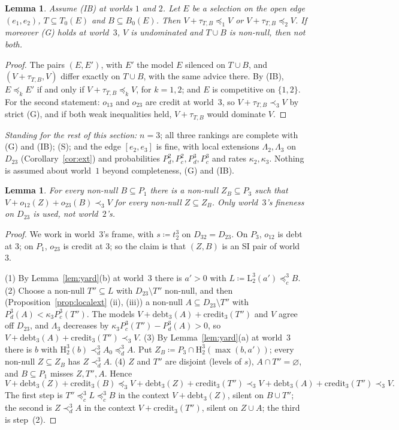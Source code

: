 \documentclass[11pt]{article}
\newtheorem{lemma}[theorem]{Lemma}
\theoremstyle{definition}\newtheorem{definition}[theorem]{Definition}
\theoremstyle{remark}\newtheorem{remark}[theorem]{Remark}
\newcommand{\debt}{\mathrm{debt}}
\newcommand{\cred}{\mathrm{credit}}
\newcommand{\Lo}[3]{\mathrm L^{#1}_{#2}(#3)}
\newcommand{\Hi}[3]{\mathrm H^{#1}_{#2}(#3)}
\begin{document}
\begin{lemma}\label{lem:XOR}
Assume (IB) at worlds $1$ and $2$. Let $E$ be a selection on the open edge
$(e_1,e_2)$, $T\subseteq T_0(E)$ and $B\subseteq B_0(E)$. Then
$V+\tau_{T,B}\preceq_1V$ or $V+\tau_{T,B}\preceq_2V$. If moreover (G) holds
at world~$3$, $V$ is undominated and $T\cup B$ is non-null, then not both.
\end{lemma}
\begin{proof}
The pairs $(E,E')$, with $E'$ the model $E$ silenced on $T\cup B$, and
$(V+\tau_{T,B},V)$ differ exactly on $T\cup B$, with the same advice there.
By (IB), $E\preceq_kE'$ if and only if $V+\tau_{T,B}\preceq_kV$, for
$k=1,2$; and $E$ is competitive on $\{1,2\}$. For the second statement:
$o_{13}$ and $o_{23}$ are credit at world~$3$, so $V+\tau_{T,B}\prec_3V$ by
strict (G), and if both weak inequalities held, $V+\tau_{T,B}$ would dominate
$V$.
\end{proof}

\emph{Standing for the rest of this section:} $n=3$; all three rankings are
complete with (G) and (IB); (S); and the edge $[e_2,e_3]$ is fine, with local
extensions $\Lambda_2,\Lambda_3$ on $D_{23}$ (Corollary~\ref{cor:ext}) and
probabilities $P^2_d,P^2_c,P^3_d,P^3_c$ and rates $\kappa_2,\kappa_3$. Nothing
is assumed about world~$1$ beyond completeness, (G) and (IB).

\begin{lemma}\label{lem:B1}
For every non-null $B\subseteq P_1$ there is a non-null $Z_B\subseteq P_3$
such that $V+o_{12}(Z)+o_{23}(B)\prec_3V$ for every non-null
$Z\subseteq Z_B$. Only world~$3$'s fineness on $D_{23}$ is used, not
world~$2$'s.
\end{lemma}
\begin{proof}
We work in world~$3$'s frame, with $s\coloneqq t^3_2$ on $D_{32}=D_{23}$. On
$P_3$, $o_{12}$ is debt at $3$; on $P_1$, $o_{23}$ is credit at $3$; so the
claim is that $(Z,B)$ is an SI pair of world~$3$.

(1) By Lemma~\ref{lem:yard}(b) at world~$3$ there is $a'>0$ with
$L\coloneqq\Lo32{a'}\preceq^3_cB$. (2) Choose a non-null $T''\subseteq L$
with $D_{23}\setminus T''$ non-null, and then (Proposition~\ref{prop:localext}
(ii), (iii)) a non-null $A\subseteq D_{23}\setminus T''$ with
$P^3_d(A)<\kappa_3P^3_c(T'')$. The models $V+\debt_3(A)+\cred_3(T'')$ and $V$
agree off $D_{23}$, and $\Lambda_3$ decreases by
$\kappa_3P^3_c(T'')-P^3_d(A)>0$, so $V+\debt_3(A)+\cred_3(T'')\prec_3V$.
(3) By Lemma~\ref{lem:yard}(a) at world~$3$ there is $b$ with
$\Hi32b\prec^3_dA_0\preceq^3_dA$. Put
$Z_B\coloneqq P_3\cap\Hi32{\max(b,a')}$; every non-null $Z\subseteq Z_B$ has
$Z\prec^3_dA$. (4) $Z$ and $T''$ are disjoint (levels of $s$), $A\cap
T''=\varnothing$, and $B\subseteq P_1$ misses $Z,T'',A$. Hence
\[
 V+\debt_3(Z)+\cred_3(B)\preceq_3V+\debt_3(Z)+\cred_3(T'')
 \prec_3V+\debt_3(A)+\cred_3(T'')\prec_3V.
\]
The first step is $T''\preceq^3_cL\preceq^3_cB$ in the context
$V+\debt_3(Z)$, silent on $B\cup T''$; the second is $Z\prec^3_dA$ in the
context $V+\cred_3(T'')$, silent on $Z\cup A$; the third is step~(2).
\end{proof}
\end{document}
